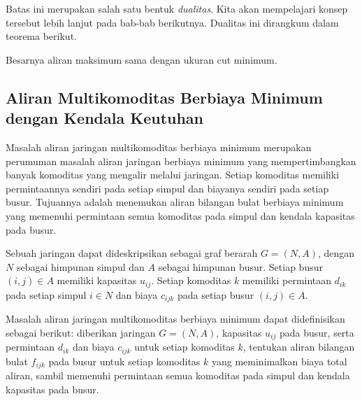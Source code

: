 Batas ini merupakan salah satu bentuk \emph{dualitas}. Kita akan mempelajari konsep tersebut lebih lanjut pada bab-bab berikutnya. Dualitas ini dirangkum dalam teorema berikut.

\begin{theorem}{}
Besarnya aliran maksimum sama dengan ukuran cut minimum.
\end{theorem}

%
%
\subsection{Aliran Multikomoditas Berbiaya Minimum dengan Kendala Keutuhan}
\label{sec:multicommodity-flow}

Masalah aliran jaringan multikomoditas berbiaya minimum merupakan perumuman masalah aliran jaringan berbiaya minimum yang mempertimbangkan banyak komoditas yang mengalir melalui jaringan. Setiap komoditas memiliki permintaannya sendiri pada setiap simpul dan biayanya sendiri pada setiap busur. Tujuannya adalah menemukan aliran bilangan bulat berbiaya minimum yang memenuhi permintaan semua komoditas pada simpul dan kendala kapasitas pada busur.

Sebuah jaringan dapat dideskripsikan sebagai graf berarah \( G = (N, A) \), dengan \( N \) sebagai himpunan simpul dan \( A \) sebagai himpunan busur. Setiap busur \( (i, j) \in A \) memiliki kapasitas \( u_{ij} \). Setiap komoditas \( k \) memiliki permintaan \( d_{ik} \) pada setiap simpul \( i \in N \) dan biaya \( c_{ijk} \) pada setiap busur \( (i, j) \in A \).

Masalah aliran jaringan multikomoditas berbiaya minimum dapat didefinisikan sebagai berikut: diberikan jaringan \( G = (N, A) \), kapasitas \( u_{ij} \) pada busur, serta permintaan \( d_{ik} \) dan biaya \( c_{ijk} \) untuk setiap komoditas \( k \), tentukan aliran bilangan bulat \( f_{ijk} \) pada busur untuk setiap komoditas \( k \) yang meminimalkan biaya total aliran, sambil memenuhi permintaan semua komoditas pada simpul dan kendala kapasitas pada busur.

